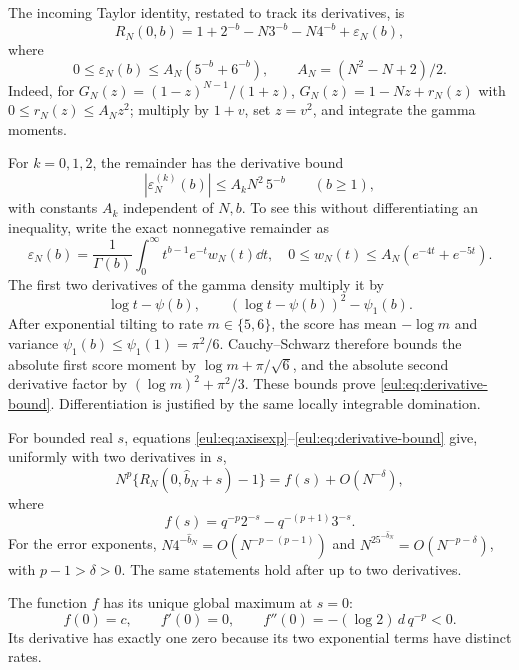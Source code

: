 The incoming Taylor identity, restated to track its derivatives, is
\begin{equation}\label{eul:eq:axisexp}
 R_N(0,b)=1+2^{-b}-N3^{-b}-N4^{-b}+\varepsilon_N(b),
\end{equation}
where
\begin{equation}\label{eul:eq:axisrem}
 0\leq\varepsilon_N(b)\leq
 A_N(5^{-b}+6^{-b}),\qquad A_N=(N^2-N+2)/2.
\end{equation}
Indeed, for $G_N(z)=(1-z)^{N-1}/(1+z)$,
$G_N(z)=1-Nz+r_N(z)$ with
$0\leq r_N(z)\leq A_Nz^2$; multiply by $1+v$, set $z=v^2$, and
integrate the gamma moments.

For $k=0,1,2$, the remainder has the derivative bound
\begin{equation}\label{eul:eq:derivative-bound}
 |\varepsilon_N^{(k)}(b)|\leq A_k N^2\,5^{-b}
 \qquad(b\geq1),
\end{equation}
with constants $A_k$ independent of $N,b$.
To see this without differentiating an inequality, write the exact
nonnegative remainder as
\[
 \varepsilon_N(b)=\frac1{\Gamma(b)}\int_0^\infty
 t^{b-1}e^{-t}w_N(t)\dd t,
 \quad 0\leq w_N(t)\leq A_N(e^{-4t}+e^{-5t}).
\]
The first two derivatives of the gamma density multiply it by
\[
 \log t-\psi(b),\qquad
 (\log t-\psi(b))^2-\psi_1(b).
\]
After exponential tilting to rate $m\in\{5,6\}$, the score has
mean $-\log m$ and variance $\psi_1(b)\leq\psi_1(1)=\pi^2/6$.
Cauchy--Schwarz therefore bounds the absolute first score moment by
$\log m+\pi/\sqrt6$, and the absolute second derivative factor by
$(\log m)^2+\pi^2/3$.  These bounds prove
\eqref{eul:eq:derivative-bound}.  Differentiation is justified by the same
locally integrable domination.

For bounded real $s$, equations \eqref{eul:eq:axisexp}--\eqref{eul:eq:derivative-bound}
give, uniformly with two derivatives in $s$,
\begin{equation}\label{eul:eq:C2profile}
 N^p\{R_N(0,\widehat b_N+s)-1\}
   =f(s)+O(N^{-\delta}),
\end{equation}
where
\[
 f(s)=q^{-p}2^{-s}-q^{-(p+1)}3^{-s}.
\]
For the error exponents, $N4^{-\widehat b_N}=O(N^{-p-(p-1)})$
and $N^25^{-\widehat b_N}=O(N^{-p-\delta})$,
with $p-1>\delta>0$.  The same statements hold after up to two
derivatives.

The function $f$ has its unique global maximum at $s=0$:
\[
 f(0)=c,\qquad f'(0)=0,\qquad
 f''(0)=-(\log2)\,d\,q^{-p}<0.
\]
Its derivative has exactly one zero because its two exponential terms
have distinct rates.

